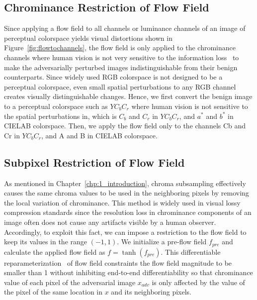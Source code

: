 \subsection{Chrominance Restriction of Flow Field}
Since applying a flow field to all channels or luminance channels of an image of perceptual colorspace yields visual distortions shown in Figure~\ref{fig:flowtochannels}, the flow field is only applied to the chrominance channels where human vision is not very sensitive to the information loss~\cite{vorobyev2004ecology} to make the adversarially perturbed images indistinguishable from their benign counterparts. Since widely used RGB colorspace is not designed to be a perceptual colorspace, even small spatial perturbations to any RGB channel creates visually distinguishable changes. Hence, we first convert the benign image to a perceptual colorspace such as \(YC_{b}C_{r}\) where human vision is not sensitive to the spatial perturbations in, which is \(C_{b}\) and \(C_{r}\) in \(YC_{b}C_{r}\), and \(a^*\) and \(b^*\) in CIELAB colorspace. Then, we apply the flow field only to the channels Cb and Cr in \(YC_{b}C_{r}\), and A and B in CIELAB colorspace.

\subsection{Subpixel Restriction of Flow Field}
As mentioned in Chapter~\ref{chp:1_introduction}, chroma subsampling effectively causes the same chroma values to be used in the neighboring pixels by removing the local variation of chrominance. This method is widely used in visual lossy compression standards since the resolution loss in chrominance components of an image often does not cause any artifacts visible by a human observer. Accordingly, to exploit this fact, we can impose a restriction to the flow field to keep its values in the range \((-1, 1)\). We initialize a pre-flow field \(f_{pre}\) and calculate the applied flow field as \(f = \tanh(f_{pre})\). This differentiable reparameterization~\cite{mordvintsev2018differentiable} of flow field constraints the flow field magnitude to be smaller than 1 without inhibiting end-to-end differentiability so that chrominance value of each pixel of the adversarial image \(x_{adv}\) is only affected by the value of the pixel of the same location in \(x\) and its neighboring pixels. %


